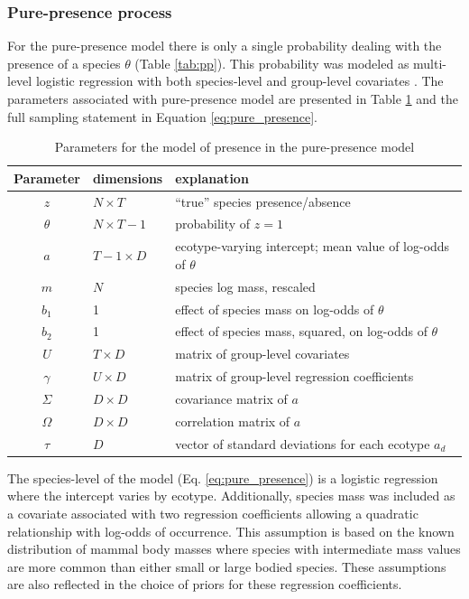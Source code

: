\documentclass[12pt,letterpaper]{article}
\begin{document}
\subsubsection*{Pure-presence process}
For the pure-presence model there is only a single probability dealing with the presence of a species \(\theta\) (Table \ref{tab:pp}). This probability was modeled as multi-level logistic regression with both species-level and group-level covariates \citep{Gelman2007,Gelman2013d}. The parameters associated with pure-presence model are presented in Table \ref{tab:pres_param} and the full sampling statement in Equation \ref{eq:pure_presence}.

\begin{table}
  \centering
  \caption{Parameters for the model of presence in the pure-presence model}
  \begin{tabular}{c l l}
    Parameter & dimensions & explanation \\
    \hline
    \(z\) & \(N \times T\) & ``true'' species presence/absence \\
    \(\theta\) & \(N \times T - 1\) & probability of \(z = 1\) \\
    \(a\) & \(T - 1 \times D\) & ecotype-varying intercept; mean value of log-odds of \(\theta\) \\
    \(m\) & \(N\) & species log mass, rescaled \\
    \(b_{1}\) & 1 & effect of species mass on log-odds of \(\theta\) \\
    \(b_{2}\) & 1 & effect of species mass, squared, on log-odds of \(\theta\) \\
    \(U\) & \(T \times D\) & matrix of group-level covariates \\
    \(\gamma\) & \(U \times D\) & matrix of group-level regression coefficients \\
    \(\Sigma\) & \(D \times D\) & covariance matrix of \(a\) \\
    \(\Omega\) & \(D \times D\) & correlation matrix of \(a\) \\
    \(\tau\) & \(D\) & vector of standard deviations for each ecotype \(a_{d}\) \\
  \end{tabular}
  \label{tab:pres_param}
\end{table}

The species-level of the model (Eq. \ref{eq:pure_presence}) is a logistic regression where the intercept varies by ecotype. Additionally, species mass was included as a covariate associated with two regression coefficients allowing a quadratic relationship with log-odds of occurrence. This assumption is based on the known distribution of mammal body masses where species with intermediate mass values are more common than either small or large bodied species. These assumptions are also reflected in the choice of priors for these regression coefficients.
\end{document}
